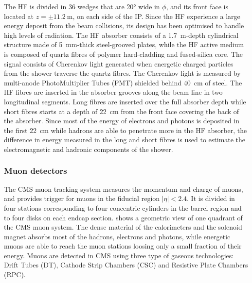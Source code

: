 The HF is divided in 36 wedges that are \ang{20} wide in $\phi$, and its front face is located at $z = {\pm}\SI{11.2}{\m}$, on each side of the IP. Since the HF experience a large energy deposit from the beam collisions, its design has been optimised to handle high levels of radiation. The HF absorber consists of a \SI{1.7}{\m}-depth cylindrical structure made of \SI{5}{\mm}-thick steel-grooved plates, while the HF active medium is composed of quartz fibres of polymer hard-cladding and fused-silica core. The signal consists of Cherenkov light generated when energetic charged particles from the shower traverse the quartz fibres. The Cherenkov light is measured by  multi-anode PhotoMultiplier Tubes (PMT) shielded behind \SI{40}{\cm} of steel. The HF fibres are inserted in the absorber grooves along the beam line in two longitudinal segments. Long fibres are inserted over the full absorber depth while short fibres starts at a depth of \SI{22}{\cm} from the front face covering the back of the absorber. Since most of the energy of electrons and photons is deposited in the first \SI{22}{\cm} while hadrons are able to penetrate more in the HF absorber, the difference in energy measured in the long and short fibres is used to estimate the electromagnetic and hadronic components of the shower.


\subsubsection{Muon detectors}\label{sec:Experiment_CMS_Subdetectors_Muon}

The CMS muon tracking system measures the momentum and charge of muons, and provides trigger for muons in the fiducial region $|\eta| < 2.4$. It is divided in four stations corresponding to four concentric cylinders in the barrel region and to four disks on each endcap section.  shows a geometric view of one quadrant of the CMS muon system. The dense material of the calorimeters and the solenoid magnet absorbs most of the hadrons, electrons and photons, while energetic muons are able to reach the muon stations loosing only a small fraction of their energy. Muons are detected in CMS using three type of gaseous technologies: Drift Tubes (DT), Cathode Strip Chambers (CSC) and Resistive Plate Chambers (RPC).

